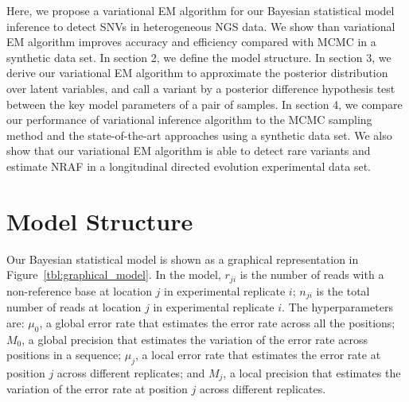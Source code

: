 \documentclass[11pt,reqno]{amsart}
\begin{document}
Here, we propose a variational EM algorithm for our Bayesian statistical model inference to detect SNVs in heterogeneous NGS data.
We show than variational EM algorithm improves accuracy and efficiency compared with MCMC in a synthetic data set.
In section 2, we define the model structure.
In section 3, we derive our variational EM algorithm to approximate the posterior distribution over latent variables, and call a variant by a posterior difference hypothesis test between the key model parameters of a pair of samples.
In section 4, we compare our performance of variational inference algorithm to the MCMC sampling method and the state-of-the-art approaches using a synthetic data set.
We also show that our variational EM algorithm is able to detect rare variants and estimate NRAF in a longitudinal directed evolution experimental data set.

\section{Model Structure}
Our Bayesian statistical model is shown as a graphical representation in Figure~\ref{tbl:graphical_model}.
In the model, $r_{ji}$ is the number of reads with a non-reference base at location $j$ in experimental replicate $i$; $n_{ji}$ is the total number of reads at location $j$ in experimental replicate $i$.
The hyperparameters are:
$\mu_0$, a global error rate that estimates the error rate across all the positions;
$M_0$, a global precision that estimates the variation of the error rate across positions in a sequence;
$ \mu_j $, a local error rate that estimates the error rate at position $j$ across different replicates;
and $M_j$, a local precision that estimates the variation of the error rate at position $j$ across different replicates.
\end{document}
